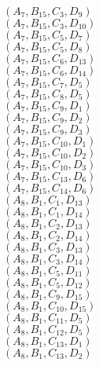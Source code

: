 \documentclass[14pt]{article}
\begin{document}
    $({A}_{7}, {B}_{15}, {C}_{3}, {D}_{9}) $ \\ 
    $({A}_{7}, {B}_{15}, {C}_{3}, {D}_{10}) $ \\ 
    $({A}_{7}, {B}_{15}, {C}_{5}, {D}_{7}) $ \\ 
    $({A}_{7}, {B}_{15}, {C}_{5}, {D}_{8}) $ \\ 
    $({A}_{7}, {B}_{15}, {C}_{6}, {D}_{13}) $ \\ 
    $({A}_{7}, {B}_{15}, {C}_{6}, {D}_{14}) $ \\ 
    $({A}_{7}, {B}_{15}, {C}_{7}, {D}_{5}) $ \\ 
    $({A}_{7}, {B}_{15}, {C}_{8}, {D}_{5}) $ \\ 
    $({A}_{7}, {B}_{15}, {C}_{9}, {D}_{1}) $ \\ 
    $({A}_{7}, {B}_{15}, {C}_{9}, {D}_{2}) $ \\ 
    $({A}_{7}, {B}_{15}, {C}_{9}, {D}_{3}) $ \\ 
    $({A}_{7}, {B}_{15}, {C}_{10}, {D}_{1}) $ \\ 
    $({A}_{7}, {B}_{15}, {C}_{10}, {D}_{2}) $ \\ 
    $({A}_{7}, {B}_{15}, {C}_{10}, {D}_{3}) $ \\ 
    $({A}_{7}, {B}_{15}, {C}_{13}, {D}_{6}) $ \\ 
    $({A}_{7}, {B}_{15}, {C}_{14}, {D}_{6}) $ \\ 
    $({A}_{8}, {B}_{1}, {C}_{1}, {D}_{13}) $ \\ 
    $({A}_{8}, {B}_{1}, {C}_{1}, {D}_{14}) $ \\ 
    $({A}_{8}, {B}_{1}, {C}_{2}, {D}_{13}) $ \\ 
    $({A}_{8}, {B}_{1}, {C}_{2}, {D}_{14}) $ \\ 
    $({A}_{8}, {B}_{1}, {C}_{3}, {D}_{13}) $ \\ 
    $({A}_{8}, {B}_{1}, {C}_{3}, {D}_{14}) $ \\ 
    $({A}_{8}, {B}_{1}, {C}_{5}, {D}_{11}) $ \\ 
    $({A}_{8}, {B}_{1}, {C}_{5}, {D}_{12}) $ \\ 
    $({A}_{8}, {B}_{1}, {C}_{9}, {D}_{15}) $ \\ 
    $({A}_{8}, {B}_{1}, {C}_{10}, {D}_{15}) $ \\ 
    $({A}_{8}, {B}_{1}, {C}_{11}, {D}_{5}) $ \\ 
    $({A}_{8}, {B}_{1}, {C}_{12}, {D}_{5}) $ \\ 
    $({A}_{8}, {B}_{1}, {C}_{13}, {D}_{1}) $ \\ 
    $({A}_{8}, {B}_{1}, {C}_{13}, {D}_{2}) $ \\ 
\end{document}
